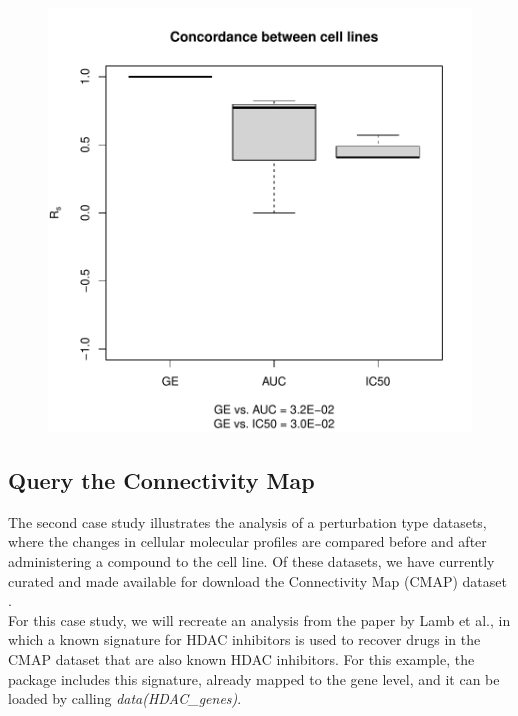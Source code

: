 \documentclass[11pt]{article}
\begin{document}
\begin{figure}[hbtp]
\begin{center}
\includegraphics{PharmacoGx-fig2}
\end{center}
\label{fig:one}
\end{figure}

\subsection{Query the Connectivity Map}

The second case study illustrates the analysis of a perturbation type datasets, where the changes in cellular molecular profiles are compared before and after administering a compound to the cell line. Of these datasets, we have currently curated and made available for download the Connectivity Map (CMAP) dataset \cite{Lamb:2006hf}. \\

For this case study, we will recreate an analysis from the paper by Lamb et al., in which a known signature for HDAC inhibitors \cite{Glaser:2003gk} is used to recover drugs in the CMAP dataset that are also known HDAC inhibitors. For this example, the package includes this signature, already mapped to the gene level, and it can be loaded by calling \textit{data(HDAC\_genes)}.
\end{document}
